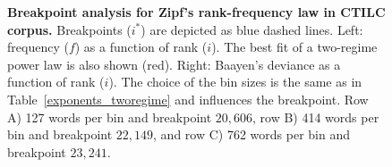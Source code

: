\documentclass[10pt,letterpaper]{article}
\newif\ifarxiv
\begin{document}
\begin{figure}[!h]
\ifarxiv
\begin{subfigure}[t]{0.03\textwidth}
    \textbf{A}
  \end{subfigure}
\begin{subfigure}{0.97\textwidth}
\texttt{[image: DIEC2\_CTILC\_senseCG\_zipf\_grup\_1\_two\_regime10.pdf]}
\end{subfigure}
\begin{subfigure}[t]{0.03\textwidth}
    \textbf{B}
  \end{subfigure}
\begin{subfigure}{0.97\textwidth}
\texttt{[image: DIEC2\_CTILC\_senseCG\_zipf\_grup\_5\_two\_regime10.pdf]}
\end{subfigure}
\begin{subfigure}[t]{0.03\textwidth}
    \textbf{C}
  \end{subfigure}
\begin{subfigure}{0.97\textwidth}
\texttt{[image: DIEC2\_CTILC\_senseCG\_zipf\_grup\_10\_two\_regime10.pdf]}
\end{subfigure}
\fi
\caption{\textbf{Breakpoint analysis for Zipf's rank-frequency law in CTILC corpus.}  Breakpoints ($i^*$) are depicted as blue dashed lines. Left: frequency ($f$) as a function of rank ($i$). The best fit of a two-regime power law is also shown (red). Right: Baayen's deviance as a function of rank ($i$).
The choice of the bin sizes is the same as in Table~\ref{exponents_tworegime} and influences the breakpoint. Row A) 127 words per bin and breakpoint $20,606$, row B) 414 words per bin and breakpoint $22,149$, and row C) 762 words per bin and breakpoint $23,241$.}
\label{fig8}
\end{figure}

\ifarxiv
\newpage\vspace*{-1.55cm}
\fi
\end{document}
